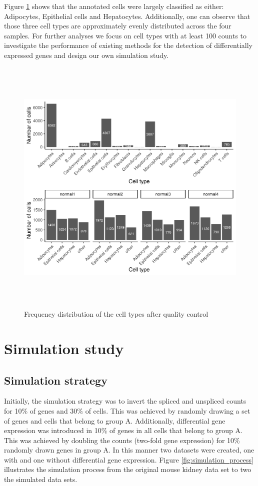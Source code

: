 \pagebreak

Figure \ref{fig:mouse_cell_type} shows that the annotated cells were largely classified as either: Adipocytes, Epithelial cells and Hepatocytes. Additionally, one can observe that those three cell types are approximately evenly distributed across the four samples. For further analyses we focus on cell types with at least 100 counts to investigate the performance of existing methods for the detection of differentially expressed genes and design our own simulation study.

\begin{figure}[!htb]
\begin{center}
\includegraphics[width=6in,height=5in]{figure/kidney_mouse/cell_type_distribution.png}
\end{center}
\caption{Frequency distribution of the cell types after quality control} 
\label{fig:mouse_cell_type}
\end{figure}
\FloatBarrier

\section{Simulation study}

\subsection{Simulation strategy}
Initially, the simulation strategy was to invert the spliced and unspliced counts for 10\% of genes and 30\% of cells. This was achieved by randomly drawing a set of genes and cells that belong to group A. Additionally, differential gene expression was introduced in 10\% of genes in all cells that belong to group A. This was achieved by doubling the counts (two-fold gene expression) for 10\% randomly drawn genes in group A. In this manner two datasets were created, one with and one without differential gene expression. Figure \ref{fig:simulation_process} illustrates the simulation process from the original mouse kidney data set to two the simulated data sets.


